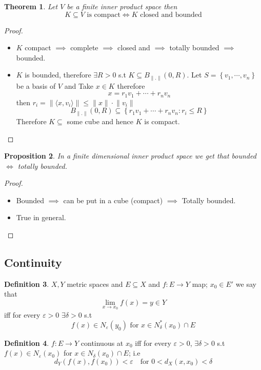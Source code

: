 \documentclass[11pt,a4paper]{article}
\theoremstyle{definition}
\newtheorem{definition}{Definition}[section]
\theoremstyle{plain}
\newtheorem{theorem}[definition]{Theorem}
\newtheorem{proposition}[definition]{Proposition}
\theoremstyle{remark}
\renewcommand{\set}[1]{\left\{ #1 \right\}}
\newcommand{\angles}[1]{\langle #1 \rangle}
\newcommand{\norm}[1]{\lVert #1 \rVert}
\begin{document}
\begin{theorem}
    Let $V$ be a finite inner product space then 
    $$K \subseteq V \text{ is compact} \iff K \text{ closed and bounded}$$ 
\end{theorem}

\begin{proof}
    \begin{itemize}
        \item $K$ compact $\implies$ complete $\implies$ closed and $\implies$ totally bounded $\implies$ bounded.
        \item $K$ is bounded, therefore $\exists R > 0$ s.t $K \subseteq B_{\norm{.}} (0, R)$. Let $S = \set{v_1, \cdots, v_n}$ be a basis of $V$ and 
        Take $x \in K$ therefore 
        $$x = r_1 v_1 + \cdots + r_n v_n$$
        then $r_i = \norm{\angles{x, v_i}} \le \norm{x} \cdot \norm{v_i}$ 
        $$B_{\norm{.}} (0, R) \subseteq \set{r_1 v_1 + \cdots + r_n v_n \colon r_i \le R}$$
        Therefore $K \subseteq$ some cube and hence $K$ is compact.  
    \end{itemize} 
\end{proof}

\begin{proposition}
    In a finite dimensional inner product space we get that bounded $\iff$ totally bounded. 
\end{proposition}

\begin{proof}
    \begin{itemize}
        \item[$\implies$] Bounded $\implies$ can be put in a cube (compact) $\implies$ Totally bounded. 
        \item[$\impliedby$] True in general.
    \end{itemize}
\end{proof}

\subsection{Continuity}
\begin{definition}
    $X, Y$ metric spaces and $E \subseteq X$ and $f \colon E \to Y$ map; $x_0 \in E'$ we say that 
    $$\lim_{x \to x_0} f(x) = y \in Y$$
    iff for every $\varepsilon > 0$ $\exists \delta > 0$ s.t 
    $$f(x) \in N_\varepsilon(y_0) \text{ for } x \in N_\delta^*(x_0) \cap E$$
\end{definition}

\begin{definition}
    $f \colon E \to Y$ continuous at $x_0$ iff for every $\varepsilon > 0$, $\exists \delta > 0$ s.t $f(x) \in N_{\varepsilon}(x_0)$ for 
    $x \in N_\delta(x_0) \cap E$; i.e 
    $$d_Y(f(x), f(x_0)) < \varepsilon \quad \text{for } 0 < d_X(x, x_0) < \delta$$
\end{definition}
\end{document}
